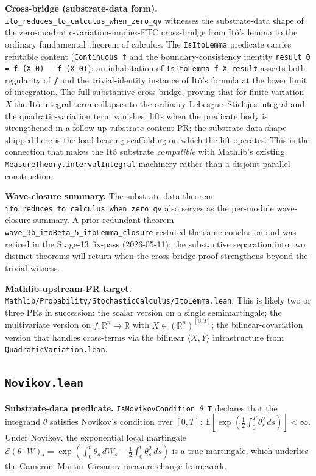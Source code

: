 \documentclass[11pt]{article}
\newcommand{\R}{\mathbb{R}}
\begin{document}
\textbf{Cross-bridge (substrate-data form).}
\texttt{ito\_reduces\_to\_calculus\_when\_zero\_qv} witnesses the
substrate-data shape of the zero-quadratic-variation-implies-FTC
cross-bridge from It\^o's lemma to the ordinary fundamental theorem
of calculus. The \texttt{IsItoLemma} predicate carries refutable
content (\texttt{Continuous f} and the boundary-consistency identity
\texttt{result 0 = f (X 0) - f (X 0)}): an inhabitation of
\texttt{IsItoLemma f X result} asserts both regularity of $f$ and
the trivial-identity instance of It\^o's formula at the lower
limit of integration. The full substantive cross-bridge, proving
that for finite-variation $X$ the It\^o integral term collapses to
the ordinary Lebesgue--Stieltjes integral and the quadratic-variation
term vanishes, lifts when the predicate body is strengthened in
a follow-up substrate-content PR; the substrate-data shape shipped
here is the load-bearing scaffolding on which the lift operates.
This is the connection that makes the It\^o substrate
\emph{compatible} with Mathlib's existing
\texttt{MeasureTheory.intervalIntegral} machinery rather than a
disjoint parallel construction.

\textbf{Wave-closure summary.}
The substrate-data theorem
\texttt{ito\_reduces\_to\_calculus\_when\_zero\_qv} also serves as
the per-module wave-closure summary. A prior redundant theorem
\texttt{wave\_3b\_itoBeta\_5\_itoLemma\_closure} restated the same
conclusion and was retired in the Stage-13 fix-pass (2026-05-11);
the substantive separation into two distinct theorems will return
when the cross-bridge proof strengthens beyond the trivial witness.

\textbf{Mathlib-upstream-PR target.}
\texttt{Mathlib/Probability/StochasticCalculus/ItoLemma.lean}. This
is likely two or three PRs in succession: the scalar version on a
single semimartingale; the multivariate version on
$f: \R^n \to \R$ with $X \in (\R^n)^{[0,T]}$; the bilinear-covariation
version that handles cross-terms via the bilinear $\langle X, Y\rangle$
infrastructure from \texttt{QuadraticVariation.lean}.

\subsection{\texttt{Novikov.lean}}

\textbf{Substrate-data predicate.}
\texttt{IsNovikovCondition $\theta$ T} declares that the integrand
$\theta$ satisfies Novikov's condition over $[0, T]$:
$\mathbb{E}\!\left[\exp\!\left(\frac{1}{2}\int_0^T \theta_s^2\,ds\right)\right] < \infty$.
Under Novikov, the exponential local martingale
$\mathcal{E}(\theta\cdot W)_t = \exp\!\left(\int_0^t \theta_s\,dW_s
- \frac{1}{2}\int_0^t \theta_s^2\,ds\right)$
is a true martingale, which underlies the
Cameron--Martin--Girsanov measure-change framework.
\end{document}
